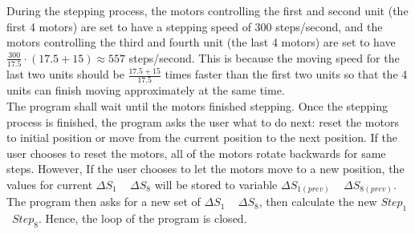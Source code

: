 \begin{itemize}
    During the stepping process, the motors controlling the first and second unit (the first 4 motors) are set 
    to have a stepping speed of 300 steps/second, and the motors controlling the third and fourth unit 
    (the last 4 motors) are set to have $\frac{300}{17.5}\cdot(17.5+15)\approx 557$ steps/second. This is because 
    the moving speed for the last two units should be $\frac{17.5+15}{17.5}$ times faster than the first two units 
    so that the 4 units can finish moving approximately at the same time. \\
    The program shall wait until the motors finished stepping. Once the stepping process is finished, the program 
    asks the user what to do next: reset the motors to initial position or move from the current position to the 
    next position. If the user chooses to reset the motors, all of the motors rotate backwards for same steps. 
    However, If the user chooses to let the motors move to a new position, the values for current $\Delta S_1$ ~ 
    $\Delta S_8$ will be stored to variable $\Delta S_{1(prev)}$ ~ $\Delta S_{8(prev)}$. The program then asks for 
    a new set of $\Delta S_1$ ~ $\Delta S_8$, then calculate the new $Step_1$ ~$Step_8$. Hence, the loop of the 
    program is closed.
\end{itemize}
